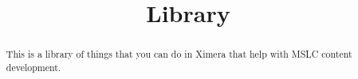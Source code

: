 \documentclass{xourse}
\title{Library}
\begin{document}
\begin{abstract}
This is a library of things that you can do in Ximera that help with MSLC content development. 
\end{abstract}

\maketitle
{}
\end{document}
